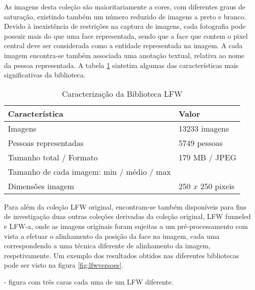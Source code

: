 As imagens desta coleção são maioritariamente a cores, com diferentes graus de saturação, existindo também um número reduzido de imagens a preto e branco. Devido à inexistência de restrições na captura de imagens, cada fotografia pode possuir mais do que uma face representada, sendo que a face que contem o pixel central deve ser considerada como a entidade representada na imagem. A cada imagem encontra-se também associada uma anotação textual, relativa ao nome da pessoa representada. A tabela \ref{tab:lfw} sintetiza algumas das características mais significativas da biblioteca.

\begin{center}
\begin{table}
	\caption{Caracterização da Biblioteca LFW}
	\begin{center}
    \begin{tabular}{ll}
    \hline
    Característica                            & Valor            \\ \hline
    Imagens                                   & 13233 imagens    \\
    Pessoas representadas                     & 5749 pessoas     \\
    Tamanho total / Formato                   & 179 MB / JPEG    \\
    Tamanho de cada imagem: min / médio / max & ~                \\
    Dimensões imagem                          & 250 $x$ 250 pixeis \\
    \hline
    \end{tabular}
	\label{tab:lfw}
	\end{center}
\end{table}
\end{center}

Para além da coleção LFW original, encontram-se também disponíveis para fins de investigação duas outras coleções derivadas da coleção original, LFW funneled e LFW-a, onde as imagens originais foram sujeitas a um pré-processamento com vista a efetuar o alinhamento da posição da face na imagem, cada uma correspondendo a uma técnica diferente de alinhamento da imagem, respetivamente. Um exemplo dos resultados obtidos nas diferentes bibliotecas pode ser visto na figura \ref{fig:lfwversoes}.

- figura com três caras cada uma de um LFW diferente.


